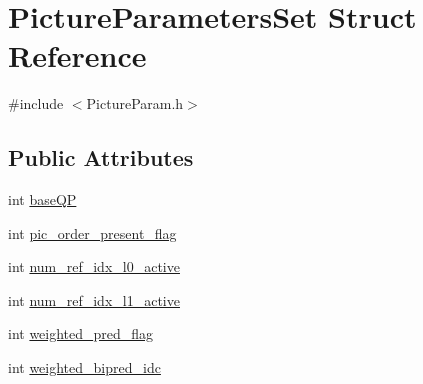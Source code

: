\hypertarget{struct_picture_parameters_set}{
\section{PictureParametersSet Struct Reference}
\label{struct_picture_parameters_set}
}


{\ttfamily \#include $<$PictureParam.h$>$}

\subsection*{Public Attributes}
\begin{DoxyCompactItemize}
\item 
int \hyperlink{struct_picture_parameters_set_a1c6a508d31929ad84dec0b717ac484a4}{baseQP}
\item 
int \hyperlink{struct_picture_parameters_set_a9611d788502cf2646a1fafd8f1cc7e4f}{pic\_\-order\_\-present\_\-flag}
\item 
int \hyperlink{struct_picture_parameters_set_abc9eb8dcb637bef8a76a7c12380fccf9}{num\_\-ref\_\-idx\_\-l0\_\-active}
\item 
int \hyperlink{struct_picture_parameters_set_afb1dc1e024b6c9263e33d3f1dd233203}{num\_\-ref\_\-idx\_\-l1\_\-active}
\item 
int \hyperlink{struct_picture_parameters_set_a4cd484fee6229fd37fa2bf7519458f3a}{weighted\_\-pred\_\-flag}
\item 
int \hyperlink{struct_picture_parameters_set_a436591953af7e22c28e0e2844acdf9f3}{weighted\_\-bipred\_\-idc}
\end{DoxyCompactItemize}


